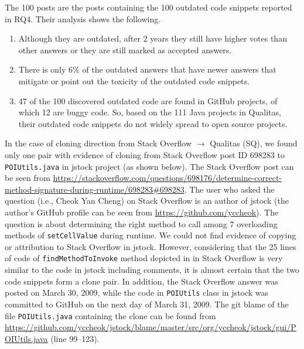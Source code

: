 \documentclass[a4paper,twoside,10pt]{reviewresponse}
\begin{document}
The 100 posts are the posts containing the 100 outdated code snippets reported in RQ4. Their analysis shows the following. 
\begin{enumerate}
	\item Although they are outdated, after 2 years they still have higher votes than other answers or they are still marked as accepted answers.
	\item There is only 6\% of the outdated answers that have newer answers that mitigate or point out the toxicity of the outdated code snippets. 
	\item 47 of the 100 discovered outdated code are found in GitHub projects, of which 12 are buggy code. So, based on the 111 Java projects in Qualitas, their outdated code snippets do not widely spread to open source projects.
\end{enumerate}


In the case of cloning direction from Stack Overflow $\rightarrow$ Qualitas
(SQ), we found only one pair with evidence of cloning from Stack Overflow post
ID 698283 to {\small\texttt{POIUtils.java}} in \textsf{jstock} project (as shown below). 
The Stack Overflow post can be seen from \url{https://stackoverflow.com/questions/698176/determine-correct-method-signature-during-runtime/698283#698283}.
The user who asked the question (i.e., Cheok Yan Cheng) on Stack Overflow is an author of \textsf{jstock} (the author's GitHub profile can be seen from \url{https://github.com/yccheok}). The
question is about determining the right method to call among 7 overloading
methods of {\small\texttt{setCellValue}} during runtime. We could not find
evidence of copying or attribution to Stack Overflow in \textsf{jstock}.
However, considering that the 25 lines of code of
{\small\texttt{findMethodToInvoke}} method depicted in  in Stack Overflow is
very similar to the code in \textsf{jstock} including comments, it is almost
certain that the two code snippets form a clone pair. In addition, the Stack
Overflow answer was posted on March 30, 2009, while the code in
{\small\texttt{POIUtils}} class in \textsf{jstock} was committed to GitHub on
the next day of March 31, 2009. 
The git blame of the file \texttt{POIUtils.java} 
containing the clone can be found from \url{https://github.com/yccheok/jstock/blame/master/src/org/yccheok/jstock/gui/POIUtils.java} (line 99--123).
\end{document}
